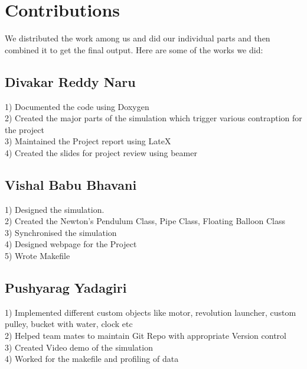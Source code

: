 \chapter{Contributions}


We distributed the work among us and did our individual parts and then combined it to get the final output. 
 Here are some of the works we did:
 \section{Divakar Reddy Naru}
 1) Documented the code using Doxygen \\
2) Created the major parts of the simulation which trigger various contraption for the project \\
3) Maintained the Project report using LateX \\
4) Created the slides for project review using beamer 
 \section{ Vishal Babu Bhavani} 
1) Designed the simulation. \\
2) Created the Newton's Pendulum Class, Pipe Class, Floating Balloon Class \\
3) Synchronised the simulation \\
4) Designed webpage for the Project \\
5) Wrote Makefile 
 \section{Pushyarag Yadagiri} 
1) Implemented different custom objects like motor, revolution launcher, custom pulley, bucket with water, clock etc \\
2) Helped team mates to maintain Git Repo with appropriate Version control \\
3) Created Video demo of the simulation \\
4) Worked for the makefile and profiling of data \\